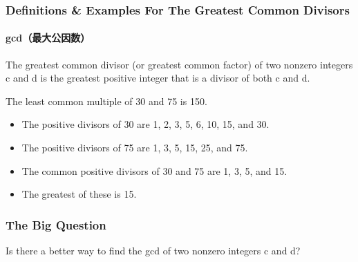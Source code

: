 \documentclass[
	11pt, %
	handout,
]{beamer}
\begin{document}

\begin{frame}
	\frametitle{Definitions \& Examples For The Greatest Common Divisors}
	\framesubtitle{gcd（最大公因数）}
	
	\begin{definition}
	The greatest common divisor (or greatest common factor) of two
nonzero integers c and d is the greatest \alert{positive} integer that is a divisor of
both c and d.
	\end{definition}
	
	\smallskip %
	
	\begin{example}
	The least common multiple of 30 and 75 is 150.
		\begin{itemize}
			\item The positive divisors of 30 are 1, 2, 3, 5, 6, 10, 15, and 30.
			\item The positive divisors of 75 are 1, 3, 5, 15, 25, and 75.
			\item The common positive divisors of 30 and 75 are 1, 3, 5, and 15.
			\item The greatest of these is 15.
		\end{itemize}
	\end{example}
\end{frame}


\begin{frame}
	\frametitle{The Big Question}
	\bigskip
	{\LARGE Is there a better way to find the gcd of two nonzero integers c and d?}
	\bigskip
\end{frame}

\end{document}
